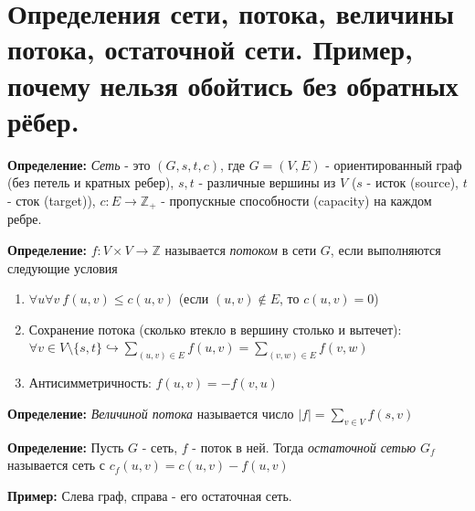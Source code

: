 \setcounter{section}{71}
\section{Определения сети, потока, величины потока, остаточной сети. Пример, почему нельзя обойтись без обратных рёбер.}
\par \textbf{Определение:} \textit{Сеть} - это $(G, s, t, c)$, где $G=(V, E)$ - ориентированный граф (без петель и кратных ребер), $s, t$ - различные вершины из $V$ ($s$ - исток (source), $t$ - сток (target)), $c: E \rightarrow \mathbb{Z}_+$ - пропускные способности (capacity) на каждом ребре.
\par \textbf{Определение:} $f: V \times V \rightarrow \mathbb{Z}$ называется \textit{потоком} в сети $G$, если выполняются следующие условия\begin{enumerate}
    \item $\forall u \forall v \: f(u,v) \leq c(u,v)$ (если $(u,v)\not\in E$, то $c(u,v)=0$)
    \item Сохранение потока (сколько втекло в вершину столько и вытечет): $\forall v \in V \setminus \{s, t\} \hookrightarrow \sum_{(u,v)\in E}f(u,v)=\sum_{(v,w)\in E} f(v,w)$
    \item Антисимметричность: $f(u,v)=-f(v,u)$
\end{enumerate}
\par \textbf{Определение:} \textit{Величиной потока} называется число $|f|=\sum_{v \in V} f(s, v)$
\par \textbf{Определение:} Пусть $G$ - сеть, $f$ - поток в ней. Тогда \textit{остаточной сетью} $G_f$ называется сеть с $c_f(u,v)=c(u,v)-f(u,v)$
\par \textbf{Пример:} Слева граф, справа - его остаточная сеть.
